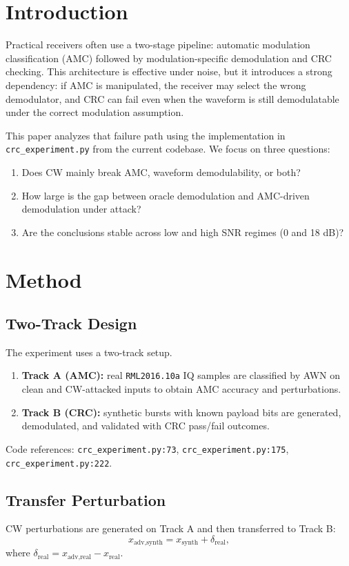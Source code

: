 \section{Introduction}
Practical receivers often use a two-stage pipeline: automatic modulation classification (AMC)
followed by modulation-specific demodulation and CRC checking. This architecture is effective
under noise, but it introduces a strong dependency: if AMC is manipulated, the receiver may
select the wrong demodulator, and CRC can fail even when the waveform is still demodulatable
under the correct modulation assumption.

This paper analyzes that failure path using the implementation in \texttt{crc\_experiment.py}
from the current codebase. We focus on three questions:
\begin{enumerate}
\item Does CW mainly break AMC, waveform demodulability, or both?
\item How large is the gap between oracle demodulation and AMC-driven demodulation under attack?
\item Are the conclusions stable across low and high SNR regimes (0 and 18 dB)?
\end{enumerate}

\section{Method}
\subsection{Two-Track Design}
The experiment uses a two-track setup.
\begin{enumerate}
\item \textbf{Track A (AMC):} real \texttt{RML2016.10a} IQ samples are classified by AWN on clean
and CW-attacked inputs to obtain AMC accuracy and perturbations.
\item \textbf{Track B (CRC):} synthetic bursts with known payload bits are generated, demodulated,
and validated with CRC pass/fail outcomes.
\end{enumerate}

Code references:
\texttt{crc\_experiment.py:73}, \texttt{crc\_experiment.py:175}, \texttt{crc\_experiment.py:222}.

\subsection{Transfer Perturbation}
CW perturbations are generated on Track A and then transferred to Track B:
\begin{equation}
x_{\text{adv,synth}} = x_{\text{synth}} + \delta_{\text{real}},
\end{equation}
where $\delta_{\text{real}} = x_{\text{adv,real}} - x_{\text{real}}$.

